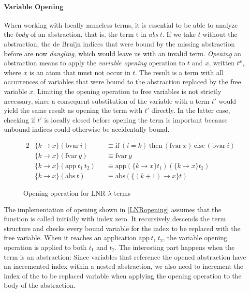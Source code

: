 \documentclass[a4paper, 11pt, fleqn]{scrreprt}
\begin{document}
	\paragraph{Variable Opening} When working with locally nameless terms, it is essential to be able to analyze the \textit{body} of an abstraction, that is, the term t in $abs \ t$. If we take $t$ without the abstraction, the de Bruijn indices that were bound by the missing abstraction before are now \textit{dangling}, which would leave us with an invalid term. \textit{Opening} an abstraction means to apply the \textit{variable opening} operation to $t$ and $x$, written $t^x$, where $x$ is an atom that must not occur in $t$. The result is a term with all occurrences of variables that were bound to the abstraction replaced by the free variable $x$. Limiting the opening operation to free variables is not strictly necessary, since a consequent substitution of the variable with a term $t'$ would yield the same result as opening the term with $t'$ directly. In the latter case, checking if $t'$ is locally closed before opening the term is important because unbound indices could otherwise be accidentally bound.
	\begin{figure}[H]
		\begin{alignat*}{2}
		&\{k \rightarrow x\} (\text{bvar} \ i) &&\equiv \text{if} \ (i = k) \ \text{then} \ (\text{fvar} \ x) \ \text{else} \ (\text{bvar} \ i) \\
		&\{k \rightarrow x\} (\text{fvar} \ y) &&\equiv \text{fvar} \ y \\
		&\{k \rightarrow x\} (\text{app} \ t_1 \ t_2) &&\equiv \text{app} (\{k \rightarrow x \} t_1)(\{k \rightarrow x \} t_2) \\
		&\{k \rightarrow x\} (\text{abs} \ t) &&\equiv \text{abs} (\{(k + 1) \rightarrow x \}t)
		\end{alignat*}
		\caption{Opening operation for LNR $\lambda$-terms}
		\label{LNRopening}
	\end{figure} \noindent
	The implementation of opening shown in \autoref{LNRopening} assumes that the function is called initially with index zero. It recursively descends the term structure and checks every bound variable for the index to be replaced with the free variable. When it reaches an application $\text{app} \ t_1 \ t_2$, the variable opening operation is applied to both $t_1$ and $t_2$. The interesting part happens when the term is an abstraction: Since variables that reference the opened abstraction have an incremented index within a nested abstraction, we also need to increment the index of the to be replaced variable when applying the opening operation to the body of the abstraction.
\end{document}
